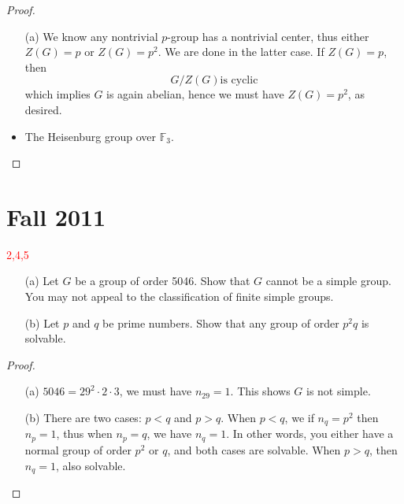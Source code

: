 \documentclass[openany]{book}
\newcommand{\F}{\mathbb{F}}
\begin{document}
\begin{proof}
    \begin{itemize}
        \item[(a)] We know any nontrivial $p$-group has a nontrivial center, thus either $Z(G)=p$ or $Z(G)=p^2$. We are done in the latter case. If $Z(G)=p$, then 
        \begin{equation*}
            G/Z(G) \text{is cyclic}
        \end{equation*}
        which implies $G$ is again abelian, hence we must have $Z(G)=p^2$, as desired.
    \end{itemize}
    \begin{itemize}
        \item The Heisenburg group over $\F_3$.
    \end{itemize}
\end{proof}





\chapter{Fall 2011}

\textcolor{red}{2,4,5}

\begin{prob}
    \begin{itemize}
        \item[(a)] Let \(G\) be a group of order 5046. Show that \(G\) cannot be a simple group. You may not appeal to the classification of finite simple groups.
        \item[(b)] Let \(p\) and \(q\) be prime numbers. Show that any group of order \(p^2q\) is solvable.
    \end{itemize}
\end{prob}
\begin{proof}
    \begin{itemize}
        \item[(a)] $5046=29^2\cdot 2\cdot 3$, we must have $n_{29}=1$. This shows $G$ is not simple.
        \item[(b)] There are two cases: $p<q$ and $p>q$. When $p<q$, we if $n_{q}=p^2$ then $n_p=1$, thus when $n_p=q$, we have $n_q=1$. In other words, you either have a normal group of order $p^2$ or $q$, and both cases are solvable. When $p>q$, then $n_q=1$, also solvable.
    \end{itemize}
\end{proof}
\end{document}
